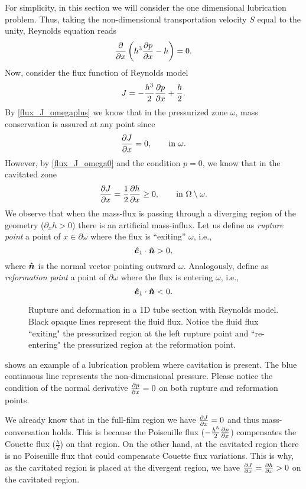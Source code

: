 For simplicity, in this section we will consider the one dimensional lubrication problem. Thus, taking the non-dimensional transportation velocity $S$ equal to the unity, Reynolds equation reads
$$\frac{\partial }{\partial x}\left( h^3\frac{\partial p}{\partial x}-h \right)=0.$$
Now, consider the flux function of Reynolds model
$$J=-\frac{h^3}{2}\frac{\partial p}{\partial x}+\frac{h}{2}.$$
By \eqref{flux_J_omegaplus} we know that in the pressurized zone $\omega$, mass conservation is assured at any point since
$$\frac{\partial J}{\partial x}=0,\qquad \text{in }\omega.$$
However, by \eqref{flux_J_omega0} and the condition $p=0$, we know that in the cavitated zone
$$\frac{\partial J}{\partial x} =\frac{1}{2}\frac{\partial h}{\partial x}\geq 0,\qquad \text{in }\Omega\setminus\omega.$$
We observe that when the mass-flux is passing through a diverging region of the geometry ($\partial_x h>0$) there is an artificial mass-influx. Let us define as \emph{rupture point}
a point of $x\in\partial \omega$ where the flux is ``exiting'' $\omega$, i.e.,
$$\boldsymbol{\hat{e}}_1\cdot \boldsymbol{\hat{n}}>0,$$
where $\boldsymbol{\hat{n}}$ is the normal vector pointing outward $\omega$. Analogously, define as \emph{reformation point} a point of $\partial \omega$ where the flux is entering $\omega$, i.e.,
$$\boldsymbol{\hat{e}}_1\cdot \boldsymbol{\hat{n}}<0.$$
\begin{figure}[ht!]
\centering 
\def\svgwidth{\textwidth}	
\caption[1D rupture and reformation scheme with Reynolds model]{Rupture and deformation in a 1D tube section with Reynolds model. Black opaque lines represent the fluid flux. Notice the fluid flux ``exiting" the pressurized region at the left rupture point and ``re-entering" the pressurized region at the reformation point.}\label{fig:mass_cons_example1}
\end{figure}
 shows an example of a lubrication problem where cavitation is present. The blue continuous line represents the non-dimensional pressure. Please notice the condition of the normal derivative $\frac{\partial p}{\partial x}=0$ on both rupture and reformation points.

We already know that in the full-film region we have $\frac{\partial J}{\partial x}=0$ and thus mass-conversation holds. This is because the Poiseuille flux ($-\frac{h^3}{2}\frac{\partial p}{\partial x}$) compensates the Couette flux ($\frac{h}{2}$) on that region. On the other hand, at the cavitated region there is no Poiseuille flux that could compensate Couette flux variations. This is why, as the cavitated region is placed at the divergent region, we have $\frac{\partial J}{\partial x}=\frac{\partial h}{\partial x}>0$ on the cavitated region.

